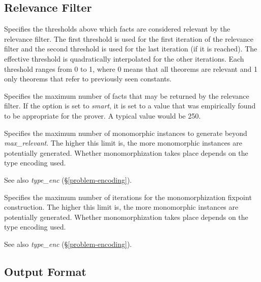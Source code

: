 \documentclass[a4paper,12pt]{article}
\begin{document}
\subsection{Relevance Filter}
\label{relevance-filter}

\begin{enum}
Specifies the thresholds above which facts are considered relevant by the
relevance filter. The first threshold is used for the first iteration of the
relevance filter and the second threshold is used for the last iteration (if it
is reached). The effective threshold is quadratically interpolated for the other
iterations. Each threshold ranges from 0 to 1, where 0 means that all theorems
are relevant and 1 only theorems that refer to previously seen constants.

Specifies the maximum number of facts that may be returned by the relevance
filter. If the option is set to \textit{smart}, it is set to a value that was
empirically found to be appropriate for the prover. A typical value would be
250.

Specifies the maximum number of monomorphic instances to generate beyond
\textit{max\_relevant}. The higher this limit is, the more monomorphic instances
are potentially generated. Whether monomorphization takes place depends on the
type encoding used.

\nopagebreak
{\small See also \textit{type\_enc} (\S\ref{problem-encoding}).}

Specifies the maximum number of iterations for the monomorphization fixpoint
construction. The higher this limit is, the more monomorphic instances are
potentially generated. Whether monomorphization takes place depends on the
type encoding used.

\nopagebreak
{\small See also \textit{type\_enc} (\S\ref{problem-encoding}).}
\end{enum}

\subsection{Output Format}
\label{output-format}
\end{document}

